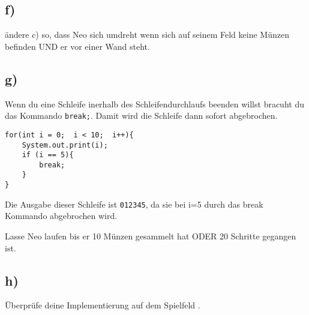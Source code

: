 	\subsection*{f)}
	ändere c) so, dass Neo sich umdreht wenn sich auf seinem Feld keine Münzen befinden UND er vor einer Wand steht.

\subsection*{g)}
\begin{Infobox}[Break]
Wenn du eine Schleife inerhalb des Schleifendurchlaufs beenden willst bracuht du das Kommando  \lstinline{break;}. Damit wird die Schleife dann sofort abgebrochen.
\begin{lstlisting}
for(int i = 0;  i < 10;  i++){
	System.out.print(i);
	if (i == 5){
		break;
	}
}
\end{lstlisting}
Die Ausgabe dieser Schleife ist \lstinline{012345}, da sie bei i=5 durch das break Kommando abgebrochen wird.
\end{Infobox}
Lasse Neo laufen bis er 10 Münzen gesammelt hat ODER 20 Schritte gegangen ist.

\subsection*{h)}
Überprüfe deine Implementierung auf dem Spielfeld .
\newpage

